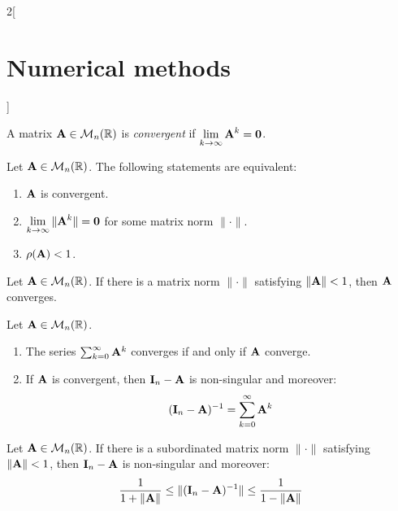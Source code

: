 \documentclass[../../../main.tex]{subfiles}
\begin{document}
\begin{multicols}{2}[\section{Numerical methods}]
    \begin{definition}
        A matrix $\vb{A}\in\mathcal{M}_n(\mathbb{R})$ is \textit{convergent} if $\displaystyle\lim_{k\to\infty}\vb{A}^k=\vb{0}$.
    \end{definition}
    \begin{theorem}
        Let $\vb{A}\in\mathcal{M}_n(\mathbb{R})$. The following statements are equivalent:
        \begin{enumerate}
            \item $\vb{A}$ is convergent.
            \item $\displaystyle\lim_{k\to\infty}\|\vb{A}^k\|=\vb{0}$ for some matrix norm $\|\cdot\|$.
            \item $\rho(\vb{A})<1$.
        \end{enumerate}
    \end{theorem}
    \begin{corollary}
        Let $\vb{A}\in\mathcal{M}_n(\mathbb{R})$. If there is a matrix norm $\|\cdot\|$ satisfying $\|\vb{A}\|<1$, then $\vb{A}$ converges.
    \end{corollary}
    \begin{theorem}
        Let $\vb{A}\in\mathcal{M}_n(\mathbb{R})$.
        \begin{enumerate}
            \item The series $\sum_{k=0}^\infty \vb{A}^k$ converges if and only if $\vb{A}$ converge.
            \item If $\vb{A}$ is convergent, then $\vb{I}_n-\vb{A}$ is non-singular and moreover: $$(\vb{I}_n-\vb{A})^{-1}=\sum_{k=0}^\infty\vb{A}^k$$
        \end{enumerate}
    \end{theorem}
    \begin{corollary}
        Let $\vb{A}\in\mathcal{M}_n(\mathbb{R})$. If there is a subordinated matrix norm $\|\cdot\|$ satisfying $\|\vb{A}\|<1$, then $\vb{I}_n-\vb{A}$ is non-singular and moreover: $$\frac{1}{1+\|\vb{A}\|}\leq\|(\vb{I}_n-\vb{A})^{-1}\|\leq\frac{1}{1-\|\vb{A}\|}$$
    \end{corollary}

\end{multicols}
\end{document}

